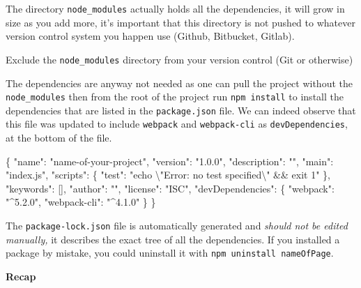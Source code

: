 \documentclass[
  10pt,
]{krantz}
\makeatletter
\newenvironment{Shaded}{\begin{snugshade}}{\end{snugshade}}
\newcommand{\CharTok}[1]{\textcolor[rgb]{0.5,0.5,0.5}{#1}}
\newcommand{\DataTypeTok}[1]{\textcolor[rgb]{0.27,0.27,0.27}{#1}}
\newcommand{\FunctionTok}[1]{\textcolor[rgb]{0,0,0}{#1}}
\newcommand{\OtherTok}[1]{\textcolor[rgb]{0.37,0.37,0.37}{#1}}
\newcommand{\StringTok}[1]{\textcolor[rgb]{0.5,0.5,0.5}{#1}}
\newenvironment{kframe}{%
\medskip{}
\setlength{\fboxsep}{.8em}
 \def\at@end@of@kframe{}%
 \ifinner\ifhmode%
  \def\at@end@of@kframe{\end{minipage}}%
  \begin{minipage}{\columnwidth}%
 \fi\fi%
 \def\FrameCommand##1{\hskip\@totalleftmargin \hskip-\fboxsep
 \colorbox{shadecolor}{##1}\hskip-\fboxsep
     \hskip-\linewidth \hskip-\@totalleftmargin \hskip\columnwidth}%
 \MakeFramed {\advance\hsize-\width
   \@totalleftmargin\z@ \linewidth\hsize
   \@setminipage}}%
 {\par\unskip\endMakeFramed%
 \at@end@of@kframe}
\renewenvironment{Shaded}{\begin{kframe}}{\end{kframe}}
\newenvironment{rmdblock}[1]
  {
  \begin{itemize}
  \renewcommand{\labelitemi}{
    \raisebox{-.7\height}[0pt][0pt]{
      {\setkeys{Gin}{width=3em,keepaspectratio}\texttt{[image: images/\#1]}}
    }
  }
  \setlength{\fboxsep}{1em}
  \begin{kframe}
  \item
  }
  {
  \end{kframe}
  \end{itemize}
  }
\newenvironment{rmdnote}
  {\begin{rmdblock}{note}}
  {\end{rmdblock}}
\makeatother
\begin{document}
The directory \texttt{node\_modules} actually holds all the dependencies, it will grow in size as you add more, it's important that this directory is not pushed to whatever version control system you happen use (Github, Bitbucket, Gitlab).

\begin{rmdnote}
Exclude the \texttt{node\_modules} directory from your version control
(Git or otherwise)
\end{rmdnote}

The dependencies are anyway not needed as one can pull the project without the \texttt{node\_modules} then from the root of the project run \texttt{npm\ install} to install the dependencies that are listed in the \texttt{package.json} file. We can indeed observe that this file was updated to include \texttt{webpack} and \texttt{webpack-cli} as \texttt{devDependencies}, at the bottom of the file.

\begin{Shaded}
\begin{Highlighting}[]
\FunctionTok{\{}
  \DataTypeTok{"name"}\FunctionTok{:} \StringTok{"name{-}of{-}your{-}project"}\FunctionTok{,}
  \DataTypeTok{"version"}\FunctionTok{:} \StringTok{"1.0.0"}\FunctionTok{,}
  \DataTypeTok{"description"}\FunctionTok{:} \StringTok{""}\FunctionTok{,}
  \DataTypeTok{"main"}\FunctionTok{:} \StringTok{"index.js"}\FunctionTok{,}
  \DataTypeTok{"scripts"}\FunctionTok{:} \FunctionTok{\{}
    \DataTypeTok{"test"}\FunctionTok{:} \StringTok{"echo }\CharTok{\textbackslash{}"}\StringTok{Error: no test specified}\CharTok{\textbackslash{}"}\StringTok{ \&\& exit 1"}
  \FunctionTok{\},}
  \DataTypeTok{"keywords"}\FunctionTok{:} \OtherTok{[]}\FunctionTok{,}
  \DataTypeTok{"author"}\FunctionTok{:} \StringTok{""}\FunctionTok{,}
  \DataTypeTok{"license"}\FunctionTok{:} \StringTok{"ISC"}\FunctionTok{,}
  \DataTypeTok{"devDependencies"}\FunctionTok{:} \FunctionTok{\{}
    \DataTypeTok{"webpack"}\FunctionTok{:} \StringTok{"\^{}5.2.0"}\FunctionTok{,}
    \DataTypeTok{"webpack{-}cli"}\FunctionTok{:} \StringTok{"\^{}4.1.0"}
  \FunctionTok{\}}
\FunctionTok{\}}
\end{Highlighting}
\end{Shaded}

The \texttt{package-lock.json} file is automatically generated and \emph{should not be edited manually,} it describes the exact tree of all the dependencies. If you installed a package by mistake, you could uninstall it with \texttt{npm\ uninstall\ nameOfPage}.

\textbf{Recap}
\end{document}
